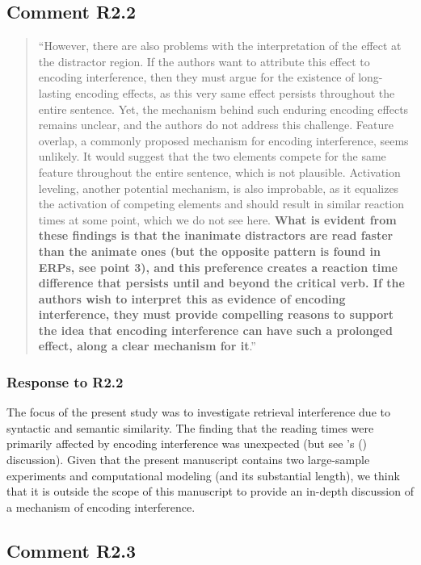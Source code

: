\documentclass[12pt]{article}
\begin{document}
\subsection*{Comment R2.2}
\begin{quote}
``However, there are also problems with the interpretation of the effect at the distractor region. If the authors want to attribute this effect to encoding interference, then they must argue for the existence of long-lasting encoding effects, as this very same effect persists throughout the entire sentence. Yet, the mechanism behind such enduring encoding effects remains unclear, and the authors do not address this challenge. Feature overlap, a commonly proposed mechanism for encoding interference, seems unlikely. It would suggest that the two elements compete for the same feature throughout the entire sentence, which is not plausible. Activation leveling, another potential mechanism, is also improbable, as it equalizes the activation of competing elements and should result in similar reaction times at some point, which we do not see here. \textbf{What is evident from these findings is that the inanimate distractors are read faster than the animate ones (but the opposite pattern is found in ERPs, see point 3), and this preference creates a reaction time difference that persists until and beyond the critical verb. If the authors wish to interpret this as evidence of encoding interference, they must provide compelling reasons to support the idea that encoding interference can have such a prolonged effect, along a clear mechanism for it}.''
\end{quote}

\subsubsection*{Response to R2.2}
The focus of the present study was to investigate retrieval interference due to syntactic and semantic similarity. The finding that the reading times were primarily affected by encoding interference was unexpected (but see \citeauthor{mertzen}'s (\citeyear{mertzen}) discussion). Given that the present manuscript contains two large-sample experiments and computational modeling (and its substantial length), we think that it is outside the scope of this manuscript to provide an in-depth discussion of a mechanism of encoding interference. 
 
\subsection*{Comment R2.3}
\end{document}
